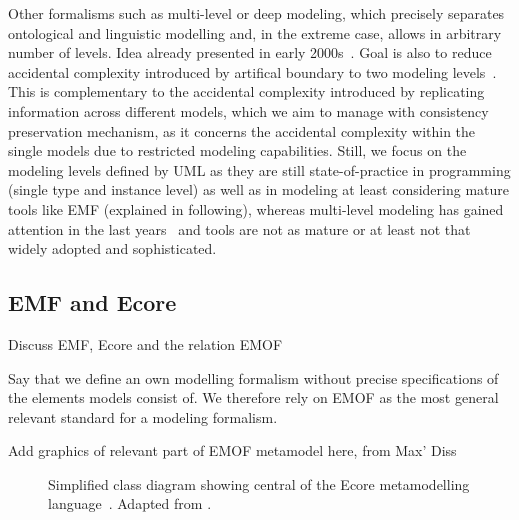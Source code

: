 Other formalisms such as multi-level or deep modeling, which precisely separates ontological and linguistic modelling and, in the extreme case, allows in arbitrary number of levels. Idea already presented in early 2000s~\cite{atkinson2003mdd-Software}.
Goal is also to reduce accidental complexity introduced by artifical boundary to two modeling levels~\cite{atkinson2008reducingAccidentalComplexity-SoSym}.
This is complementary to the accidental complexity introduced by replicating information across different models, which we aim to manage with consistency preservation mechanism, as it concerns the accidental complexity within the single models due to restricted modeling capabilities.
Still, we focus on the modeling levels defined by UML as they are still state-of-practice in programming (single type and instance level) as well as in modeling at least considering mature tools like EMF (explained in following), whereas multi-level modeling has gained attention in the last years~\cite{atkinso2014multilevel-MLM} and tools are not as mature or at least not that widely adopted and sophisticated.



\subsection{EMF and Ecore}
\label{chap:foundations:formalisms:ecore}
Discuss \gls{EMF}, Ecore and the relation EMOF

Say that we define an own modelling formalism without precise specifications of the elements models consist of. We therefore rely on EMOF as the most general relevant standard for a modeling formalism.

Add graphics of relevant part of EMOF metamodel here, from Max' Diss

\begin{figure}
    \centering
    
    \caption[Simplified Ecore metamodelling language]{Simplified class diagram showing central \metaclasses of the Ecore metamodelling language~\cite[p. 97]{steinberg2009emf}. Adapted from \cite[Fig. 2.3]{kramer2017a}.}
    \label{fig:foundations:ecore}
\end{figure}


\label{chap:foundations:formalisms:differences}

